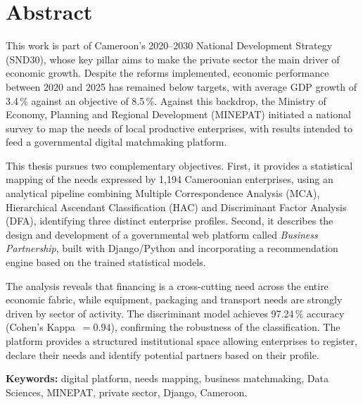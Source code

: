 \documentclass[12pt, a4paper, oneside]{report}
\begin{document}
\chapter*{Abstract}
\thispagestyle{plain}

\medskip

This work is part of Cameroon's 2020–2030 National Development Strategy (SND30), whose key pillar aims to make the private sector the main driver of economic growth. Despite the reforms implemented, economic performance between 2020 and 2025 has remained below targets, with average GDP growth of 3.4\,\% against an objective of 8.5\,\%. Against this backdrop, the Ministry of Economy, Planning and Regional Development (MINEPAT) initiated a national survey to map the needs of local productive enterprises, with results intended to feed a governmental digital matchmaking platform.

This thesis pursues two complementary objectives. First, it provides a statistical mapping of the needs expressed by 1,194 Cameroonian enterprises, using an analytical pipeline combining Multiple Correspondence Analysis (MCA), Hierarchical Ascendant Classification (HAC) and Discriminant Factor Analysis (DFA), identifying three distinct enterprise profiles. Second, it describes the design and development of a governmental web platform called \textit{Business Partnership}, built with Django/Python and incorporating a recommendation engine based on the trained statistical models.

The analysis reveals that financing is a cross-cutting need across the entire economic fabric, while equipment, packaging and transport needs are strongly driven by sector of activity. The discriminant model achieves 97.24\,\% accuracy (Cohen's Kappa~$= 0.94$), confirming the robustness of the classification. The platform provides a structured institutional space allowing enterprises to register, declare their needs and identify potential partners based on their profile.

\medskip
\textbf{Keywords:} digital platform, needs mapping, business matchmaking, Data Sciences, MINEPAT, private sector, Django, Cameroon.

\tableofcontents
{}

\listoffigures
{}

\listoftables
{}
\end{document}
